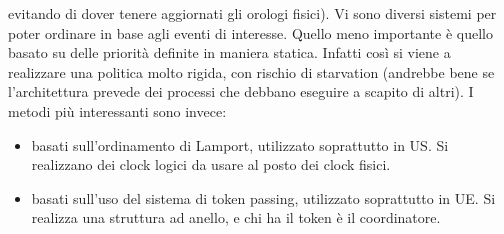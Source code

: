 evitando di dover tenere aggiornati gli orologi fisici).
Vi sono diversi sistemi per poter ordinare in base agli eventi di interesse. Quello meno importante è quello basato su
delle priorità definite in maniera statica. Infatti così si viene a realizzare una politica molto rigida, con rischio
di starvation (andrebbe bene se l'architettura prevede dei processi che debbano eseguire a scapito di altri).
I metodi più interessanti sono invece:
\begin{itemize}
 \item basati sull'ordinamento di Lamport, utilizzato soprattutto in US. Si realizzano dei clock logici da usare al
 posto dei clock fisici.
 \item basati sull'uso del sistema di token passing, utilizzato soprattutto in UE. Si realizza una struttura ad anello,
 e chi ha il token è il coordinatore.
\end{itemize}
